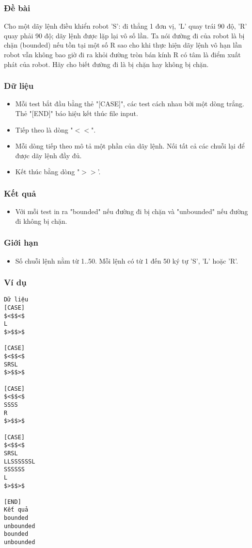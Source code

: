 



\subsubsection{   Đề bài  }

   Cho một dãy lệnh điều khiển robot 'S': đi thẳng 1 đơn vị, 'L' quay trái 90 độ, 'R' quay phải 90 độ; dãy lệnh được lặp lại vô số lần. Ta nói đường đi của robot là bị chặn (bounded) nếu tồn tại một số R sao cho khi thực hiện dãy lệnh vô hạn lần robot vẫn không bao giờ đi ra khỏi đường tròn bán kính R có tâm là điểm xuất phát của robot. Hãy cho biết đường đi là bị chặn hay không bị chặn.  

\subsubsection{   Dữ liệu  }
\begin{itemize}
	\item     Mỗi test bắt đầu bằng thẻ "[CASE]", các test cách nhau bởi một dòng trắng. Thẻ "[END]" báo hiệu kết thúc file input.   
	\item     Tiếp theo là dòng "$<$$<$".   
	\item     Mỗi dòng tiếp theo mô tả một phần của dãy lệnh. Nối tất cả các chuỗi lại để được dãy lệnh đầy đủ.   
	\item     Kết thúc bằng dòng "$>$$>$'.   
\end{itemize}

\subsubsection{   Kết quả  }
\begin{itemize}
	\item     Với mỗi test in ra "bounded" nếu đường đi bị chặn và "unbounded" nếu đường đi không bị chặn.   
\end{itemize}

\subsubsection{   Giới hạn  }
\begin{itemize}
	\item     Số chuỗi lệnh nằm từ 1..50. Mỗi lệnh có từ 1 đến 50 ký tự 'S', 'L' hoặc 'R'.   
\end{itemize}

\subsubsection{   Ví dụ  }
\begin{verbatim}
Dữ liệu
[CASE]
$<$$<$
L
$>$$>$

[CASE]
$<$$<$
SRSL
$>$$>$

[CASE]
$<$$<$
SSSS
R
$>$$>$

[CASE]
$<$$<$
SRSL
LLSSSSSSL
SSSSSS
L
$>$$>$

[END]
Kết quả
bounded
unbounded
bounded
unbounded
\end{verbatim}